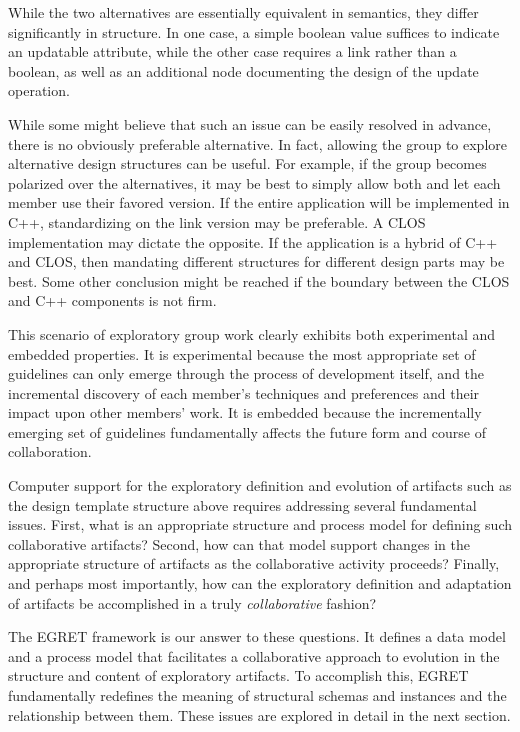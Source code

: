 While the two alternatives are essentially equivalent in semantics, they differ significantly in structure.  In one case, a simple boolean value suffices to indicate an updatable attribute, while the other case requires a link rather than a boolean, as well as an additional node documenting the design of the update operation.

While some might believe that such an issue can be easily resolved in advance, there is no obviously preferable alternative. In fact, allowing the group to explore alternative design structures can be useful. For example, if the group becomes polarized over the alternatives, it may be best to simply allow both and let each member use their favored version.  If the entire application will be implemented in C++, standardizing on the link version may be preferable. A CLOS implementation may dictate the opposite. If the application is a hybrid of C++ and CLOS, then mandating different structures for different design parts may be best.  Some other conclusion might be reached if the boundary between the CLOS and C++ components is not firm.

This scenario of exploratory group work clearly exhibits both experimental and embedded properties. It is experimental because the most appropriate set of guidelines can only emerge through the process of development itself, and the incremental discovery of each member's techniques and preferences and their impact upon other members' work.  It is embedded because the incrementally emerging set of guidelines fundamentally affects the future form and course of collaboration.

Computer support for the exploratory definition and evolution of artifacts such as the design template structure above requires addressing several fundamental issues. First, what is an appropriate structure and process model for defining such collaborative artifacts? Second, how can that model support changes in the appropriate structure of artifacts as the collaborative activity proceeds?  Finally, and perhaps most importantly, how can the exploratory definition and adaptation of artifacts be accomplished in a truly {\em collaborative}\/ fashion?

The EGRET framework is our answer to these questions.  It defines a data model and a process model that facilitates a collaborative approach to evolution in the structure and content of exploratory artifacts.  To accomplish this, EGRET fundamentally redefines the meaning of structural schemas and instances and the relationship between them.  These issues are explored in detail in the next section.

